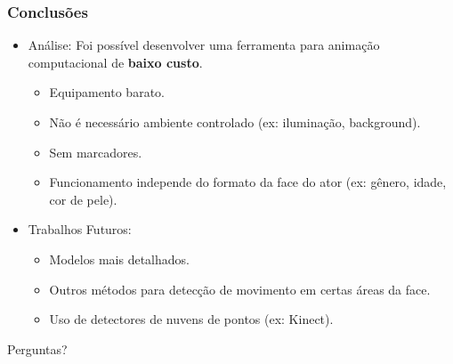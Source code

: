 \documentclass[brazil]{beamer}
\begin{document}
\begin{frame}
\frametitle{Conclusões}
  \begin{itemize}
      \item Análise:
      Foi possível desenvolver uma ferramenta para animação computacional de \textbf{baixo custo}.
      \begin{itemize}
         \item Equipamento barato.
     	 \item Não é necessário ambiente controlado (ex: iluminação, background).
     	 \item Sem marcadores.
     	 \item Funcionamento independe do formato da face do ator (ex: gênero, idade, cor de pele).              
  	  \end{itemize} 
      
      \item Trabalhos Futuros:
      \begin{itemize}
         \item Modelos mais detalhados.
     	 \item Outros métodos para detecção de movimento em certas áreas da face.
     	 \item Uso de detectores de nuvens de pontos (ex: Kinect).           
  	  \end{itemize} 
              
  \end{itemize} 
\end{frame}


\begin{frame}

\begin{center}
\Huge Perguntas?
\end{center}
  
              
\end{frame}
\end{document}
